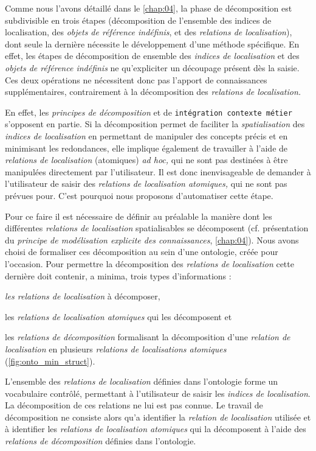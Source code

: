Comme nous l'avons détaillé dans le \autoref{chap:04}, la phase de
décomposition est subdivisible en trois étapes (décomposition de
l'ensemble des indices de localisation, des \emph{objets de référence
  indéfinis}, et des \emph{relations de localisation}), dont seule la
dernière nécessite le développement d'une méthode spécifique. En
effet, les étapes de décomposition de ensemble des \emph{indices de
  localisation} et des \emph{objets de référence indéfinis} ne
qu'expliciter un découpage présent dès la saisie. Ces deux opérations
ne nécessitent donc pas l'apport de connaissances supplémentaires,
contrairement à la décomposition des \emph{relations de localisation.}

En effet, les \emph{principes de décomposition} et de
\texttt{intégration contexte métier} s'opposent en partie. Si la
décomposition permet de faciliter la \emph{spatialisation} des
\emph{indices de localisation} en permettant de manipuler des concepts
précis et en minimisant les redondances, elle implique également de
travailler à l'aide de \emph{relations de localisation} (atomiques)
\emph{ad hoc,} qui ne sont pas destinées à être manipulées directement
par l'utilisateur. Il est donc inenvisageable de demander à
l'utilisateur de saisir des \emph{relations de localisation
  atomiques,} qui ne sont pas prévues pour. C'est pourquoi nous
proposons d'automatiser cette étape.

Pour ce faire il est nécessaire de définir au préalable la manière
dont les différentes \emph{relations de localisation} spatialisables
se décomposent (cf. présentation du \emph{principe de modélisation
  explicite des connaissances}, \autoref{chap:04}). Nous avons choisi
de formaliser ces décomposition au sein d'une ontologie, créée pour
l'occasion. Pour permettre la décomposition des \emph{relations de
  localisation} cette dernière doit contenir, a minima, trois types
d'informations :
%
\begin{enumerate*}[label=(\alph*)]
\item \emph{les relations de localisation} à décomposer,
\item les \emph{relations de localisation atomiques} qui les
  décomposent et
\item les \emph{relations de décomposition} formalisant la
  décomposition d'une \emph{relation de localisation} en plusieurs
  \emph{relations de localisations atomiques}
  (\autoref{fig:onto_min_struct}).
\end{enumerate*}
%
L'ensemble des \emph{relations de localisation} définies dans
l'ontologie forme un vocabulaire contrôlé, permettant à l'utilisateur
de saisir les \emph{indices de localisation}. La décomposition de ces
relations ne lui est pas connue. Le travail de décomposition ne
consiste alors qu'a identifier la \emph{relation de localisation}
utilisée et à identifier les \emph{relations de localisation
  atomiques} qui la décomposent à l'aide des \emph{relations de
  décomposition} définies dans l'ontologie.

